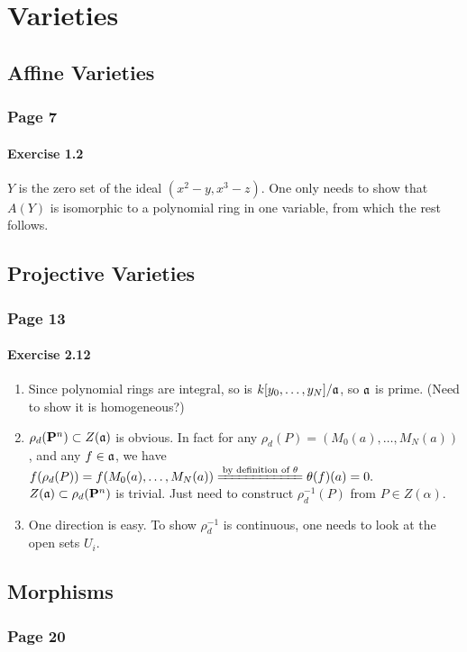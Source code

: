 \documentclass{note}
\newcommand{\Page}[1]{\subsection*{Page #1}}
\newcommand{\Ex}[1]{\subsubsection*{Exercise #1}}
\newcommand{\Proj}[1]{\mathbf{P}^{#1}}
\begin{document}
\chapter{Varieties}

\section{Affine Varieties}
\Page{7}
\Ex{1.2}
$Y$ is the zero set of the ideal $(x^2-y,x^3-z)$. One only needs to
show that $A(Y)$ is isomorphic to a polynomial ring in one variable,
from which the rest follows.

\section{Projective Varieties}
\Page{13}
\Ex{2.12}
\begin{enumerate}
\item Since polynomial rings are integral, so is
  $k[y_0,\dots,y_N]/\mathfrak{a}$, so $\mathfrak{a}$ is prime. (Need to show
  it is homogeneous?)
\item $\rho_d(\Proj{n})\subset Z(\ideal{a})$ is obvious. In fact for
  any $\rho_d(P)=(M_0(a),\dots,M_N(a))$, and any $f\in\mathfrak{a}$, we
  have
  $f(\rho_d(P)) = f(M_0(a),\dots,M_N(a)) \xlongequal{\text{by
      definition of }\theta} \theta(f)(a) = 0.$\\
  $Z(\ideal{a})\subset\rho_d(\Proj{n})$ is trivial. Just need to
  construct $\rho_d^{-1}(P)$ from $P\in Z(\alpha)$.
\item One direction is easy. To show $\rho_d^{-1}$ is continuous, one
  needs to look at the open sets $U_i$.
\end{enumerate}

\section{Morphisms}

\Page{20}
\end{document}
